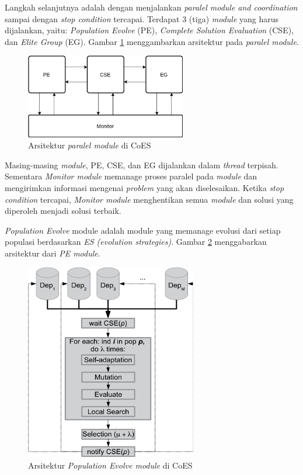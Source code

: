 Langkah selanjutnya adalah dengan menjalankan \textit{paralel module and coordination} sampai dengan \textit{stop condition} tercapai. Terdapat 3 (tiga) \textit{module} yang harus dijalankan, yaitu: \textit{Population Evolve} (PE), \textit{Complete Solution Evaluation} (CSE), dan \textit{Elite Group} (EG). Gambar \ref{fig:coes_paralel_modules} menggambarkan arsitektur pada \textit{paralel module}.


\begin{figure}[h]
	\centering
	\includegraphics[width=7cm]{../../Resources/Images/coes_paralel_modules}
	\caption{Arsitektur \textit{paralel module} di CoES}
	\label{fig:coes_paralel_modules}
\end{figure}


Masing-masing \textit{module}, PE, CSE, dan EG dijalankan dalam \textit{thread} terpisah. Sementara \textit{Monitor module} memanage proses paralel pada \textit{module} dan mengirimkan informasi mengenai \textit{problem} yang akan diselesaikan. Ketika \textit{stop condition} tercapai, \textit{Monitor module} menghentikan semua \textit{module} dan solusi yang diperoleh menjadi solusi terbaik.


\textit{Population Evolve} module adalah module yang memanage evolusi dari setiap populasi berdasarkan \textit{ES (evolution strategies)}. Gambar \ref{fig:coes_pe_module} menggabarkan arsitektur dari \textit{PE module}.


\begin{figure}[h]
	\centering
	\includegraphics[width=7.5cm]{../../Resources/Images/coes_pe_module}
	\caption{Arsitektur \textit{Population Evolve module} di CoES}
	\label{fig:coes_pe_module}
\end{figure}



